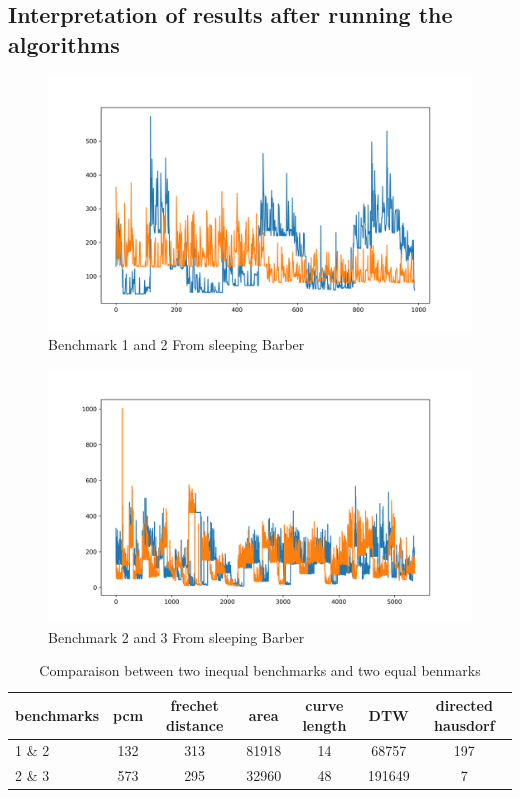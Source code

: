 \documentclass{article}
\begin{document}
\subsection{Interpretation of results after running the algorithms}

\begin{figure}[h!]
    \centering
    \includegraphics[width=1\textwidth]{plot_0.png}
    \caption{Benchmark 1 and 2 From sleeping Barber}
    \label{fig:mesh1}
\end{figure}


\begin{figure}[h!]
    \centering
    \includegraphics[width=1\textwidth]{plot_1.png}
    \caption{Benchmark 2 and 3 From sleeping Barber}
    \label{fig:mesh1}
\end{figure}

\begin{table}[h!]
\begin{tabular}{|l|c|c|c|c|c|c|}
   \hline
   benchmarks & pcm & frechet distance & area & curve length & DTW & directed hausdorf \\
   \hline
   1 \&  2 & 132 & 313 & 81918 & 14 & 68757 & 197\\
   \hline
   2 \& 3 & 573 & 295 & 32960 & 48 & 191649 & 7 \\
   \hline
\end{tabular} \\ 
\caption{Comparaison between two inequal benchmarks and two equal benmarks}
\end{table}
\end{document}
